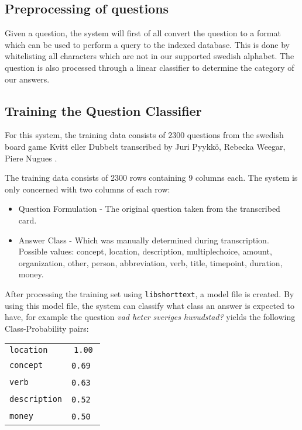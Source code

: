 \subsection{Preprocessing of questions}
Given a question, the system will first of all convert the question
to a format which can be used to perform a query to the indexed
database. This is done by whitelisting all characters which
are not in our supported swedish alphabet. The question is also
processed through a linear classifier to determine the category of our 
answers.

\subsection{Training the Question Classifier}
For this system, the training data consists of 2300 questions 
from the swedish board game Kvitt eller Dubbelt transcribed 
by Juri Pyykk\"o, Rebecka Weegar, Piere Nugues \cite{QASYS}.

The training data consists of 2300 rows containing 9 columns each.
The system is only concerned with two columns of each row:
\begin{itemize}
\item Question Formulation - The original question taken from the transcribed
  card.
\item Answer Class - Which was manually determined during transcription. 
  Possible values: concept, location, description, multiplechoice, amount, organization, 
  other, person, abbreviation, verb, title, timepoint, duration, money.
\end{itemize}

After processing the training set using \texttt{libshorttext}, a model file is created.
By using this model file, the system can classify 
what class an answer is expected to have, for example the question \textit{vad heter sveriges huvudstad?} 
yields the following Class-Probability pairs:
\begin{center}
  \begin{tabular} {l c}
    \texttt{location}    & \texttt{1.00} \\
    \texttt{concept}     & \texttt{0.69} \\
    \texttt{verb}        & \texttt{0.63} \\
    \texttt{description} & \texttt{0.52} \\
    \texttt{money}       & \texttt{0.50} \\
  \end{tabular}
\end{center}
